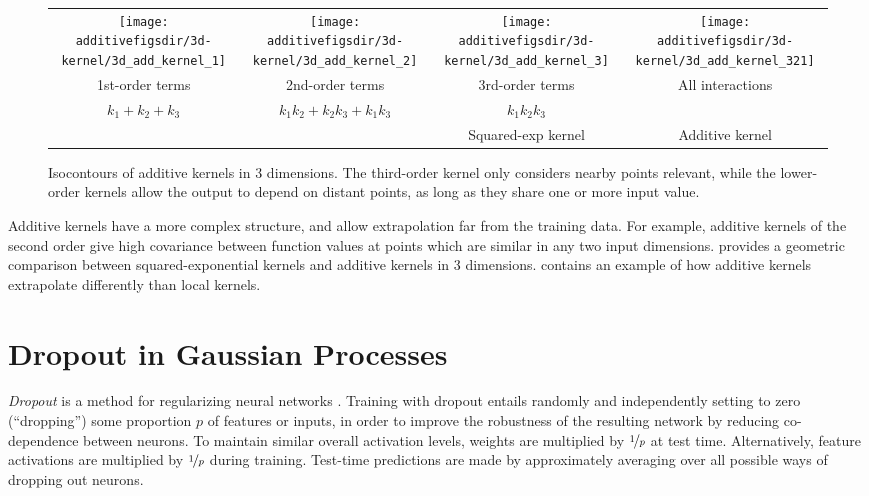 \begin{figure}[ht!]
\centering
\begin{tabular}{cccc}
\hspace{-0.1in}
 \texttt{[image: \\additivefigsdir/3d-kernel/3d\_add\_kernel\_1]} &
\hspace{-0.2in} \texttt{[image: \\additivefigsdir/3d-kernel/3d\_add\_kernel\_2]} &
\hspace{-0.2in} \texttt{[image: \\additivefigsdir/3d-kernel/3d\_add\_kernel\_3]} & 
\hspace{-0.2in} \texttt{[image: \\additivefigsdir/3d-kernel/3d\_add\_kernel\_321]}\\
1st-order terms &
2nd-order terms & 
3rd-order terms & 
All interactions \\
$k_1 + k_2 + k_3$ & $k_1k_2 + k_2k_3 + k_1k_3$ & $k_1k_2k_3$ & \\
& & Squared-exp kernel & Additive kernel\\
\end{tabular}
\caption[Isocontours of additive kernels in 3 dimensions]
{Isocontours of additive kernels in 3 dimensions.
The third-order kernel only considers nearby points relevant, while the lower-order kernels allow the output to depend on distant points, as long as they share one or more input value.}
\label{fig:kernels3d}
\end{figure}

Additive kernels have a more complex structure, and allow extrapolation far from the training data.
For example, additive kernels of the second order give high covariance between function values at points which are similar in any two input dimensions.
 provides a geometric comparison between squared-exponential kernels and additive kernels in 3 dimensions.
 contains an example of how additive kernels extrapolate differently than local kernels.





\section{Dropout in Gaussian Processes}

\emph{Dropout} is a method for regularizing neural networks \citep{hinton2012improving, srivastava2013improving}.
Training with dropout entails randomly and independently setting to zero (``dropping'') some proportion $p$ of features or inputs, in order to improve the robustness of the resulting network by reducing co-dependence between neurons.
To maintain similar overall activation levels, weights are multiplied by $\nicefrac{1}{p}$ at test time. Alternatively, feature activations are multiplied by $\nicefrac{1}{p}$ during training.
Test-time predictions are made by approximately averaging over all possible ways of dropping out neurons.

